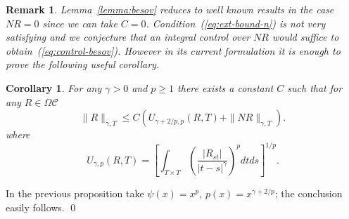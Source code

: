 \documentclass[a4paper,12pt,reqno]{amsproc}
\newcommand{\NN}{N}
\newcommand{\OCC}{\Omega \mathcal{C}}
\newtheorem{corollary}{Corollary}
\newtheorem{remark}{Remark}
\begin{document}
\begin{remark}
 Lemma~\ref{lemma:besov} reduces to well known results in the case
 $\NN R = 0$ since we can take $C=0$. Condition~(\ref{eq:ext-bound-n})
 is not very satisfying and we conjecture that an integral control
 over $\NN R$ would suffice to obtain~(\ref{eq:control-besov}).
However in its
 current formulation it is enough to prove the following useful corollary.     
\end{remark}

\begin{corollary}
For any $\gamma > 0$ and $p \ge 1$  there exists a constant
$C$ such that for any $R \in \OCC$ 
\begin{equation}
\label{eq:generalboundxx}
\|R\|_{\gamma,T} \le C (U_{\gamma+2/p,p}(R,T)+\|\NN R\|_{\gamma,T}).
\end{equation}
where
\begin{equation*}
 U_{\gamma,p}(R,T) = \left[ \int_{T \times T}
 \left(\frac{|R_{s t}|}{|t-s|^\gamma}\right)^p dt ds \right]^{1/p}.
\end{equation*}
\end{corollary}
\proof
In the previous proposition take $\psi(x) = x^p$, $p(x) =
x^{\gamma+2/p}$; 
the conclusion easily follows.
\qed

\medskip
\end{document}
